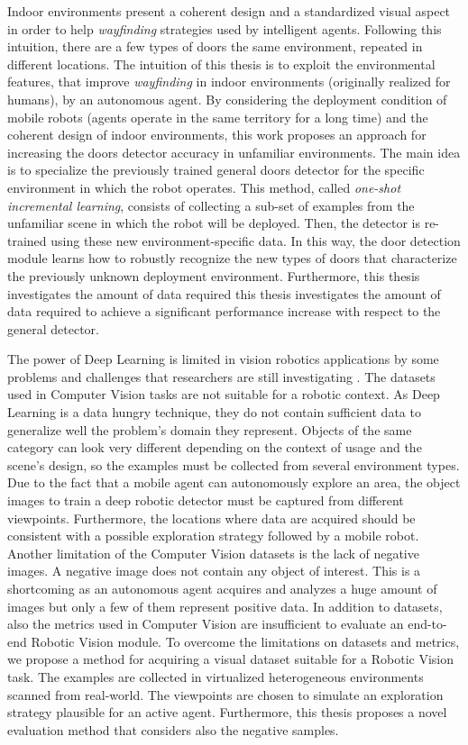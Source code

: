 Indoor environments present a coherent design and a standardized visual aspect in order to help \textit{wayfinding} strategies used by intelligent agents. Following this intuition, there are a few types of doors  the same environment, repeated in different locations. The intuition of this thesis is to exploit the environmental features, that improve \textit{wayfinding} in indoor environments (originally realized for humans), by an autonomous agent. By considering the deployment condition of mobile robots (agents operate in the same territory for a long time) and the coherent design of indoor environments, this work proposes an approach for increasing the doors detector accuracy in unfamiliar environments. The main idea is to specialize the previously trained general doors detector for the specific environment in which the robot operates. This method, called \textit{one-shot incremental learning}, consists of collecting a sub-set of examples from the unfamiliar scene in which the robot will be deployed. Then, the detector is re-trained using these new environment-specific data. In this way, the door detection module learns how to robustly recognize the new types of doors that characterize the previously unknown deployment environment. Furthermore, this thesis investigates the amount of data required this thesis investigates the amount of data required to achieve a significant performance increase with respect to the general detector.

The power of Deep Learning is limited in vision robotics applications by some problems and challenges that researchers are still investigating \cite{surveydeeplimits}. The datasets used in Computer Vision tasks are not suitable for a robotic context. As Deep Learning is a data hungry technique, they do not contain sufficient data to generalize well the problem's domain they represent. Objects of the same category can look very different depending on the context of usage and the scene's design, so the examples must be collected from several environment types. Due to the fact that a mobile agent can autonomously explore an area, the object images to train a deep robotic detector must be captured from different viewpoints. Furthermore, the locations where data are acquired should be consistent with a possible exploration strategy followed by a mobile robot. Another limitation of the Computer Vision datasets is the lack of negative images. A negative image does not contain any object of interest. This is a shortcoming as an autonomous agent acquires and analyzes a huge amount of images but only a few of them represent positive data. In addition to datasets, also the metrics used in Computer Vision are insufficient to evaluate an end-to-end Robotic Vision module. To overcome the limitations on datasets and metrics, we propose a method for acquiring a visual dataset suitable for a Robotic Vision task. The examples are collected in virtualized heterogeneous environments scanned from real-world. The viewpoints are chosen to simulate an exploration strategy plausible for an active agent. Furthermore, this thesis proposes a novel evaluation method that considers also the negative samples.

